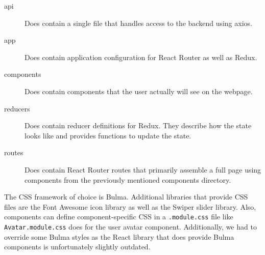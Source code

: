 \begin{description}
    \item[api] Does contain a single file that handles access to the backend using axios.
    \item[app] Does contain application configuration for React Router as well as Redux.
    \item[components] Does contain components that the user actually will see on the webpage.
    \item[reducers] Does contain reducer definitions for Redux. They describe how the state looks like and provides functions to update the state.
    \item[routes] Does contain React Router routes that primarily assemble a full page using components from the previously mentioned components directory.
\end{description}

The \acs{CSS} framework of choice is Bulma. Additional libraries that provide \acs{CSS} files are the Font Awesome icon library as well as the Swiper slider library. Also, components can define component-specific \acs{CSS} in a \texttt{.module.css} file like \texttt{Avatar.module.css} does for the user avatar component. Additionally, we had to override some Bulma styles as the React library that does provide Bulma components is unfortunately slightly outdated.
